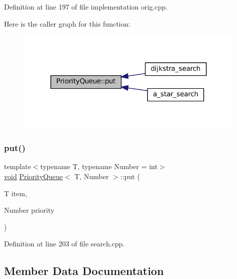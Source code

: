 Definition at line 197 of file implementation orig.\+cpp.

Here is the caller graph for this function\+:\nopagebreak
\begin{figure}[H]
\begin{center}
\leavevmode
\includegraphics[width=312pt]{struct_priority_queue_a9361c94664b98a15a91a595d65c9846c_icgraph}
\end{center}
\end{figure}
\mbox{\label{struct_priority_queue_a9361c94664b98a15a91a595d65c9846c}} 
\subsubsection{\texorpdfstring{put()}{put()}\hspace{0.1cm}{\footnotesize\ttfamily [2/2]}}
{\footnotesize\ttfamily template$<$typename T, typename Number = int$>$ \\
\mbox{\hyperlink{glad_8h_a950fc91edb4504f62f1c577bf4727c29}{void}} \mbox{\hyperlink{struct_priority_queue}{Priority\+Queue}}$<$ T, Number $>$\+::put (\begin{DoxyParamCaption}\item[{T}]{item,  }\item[{Number}]{priority }\end{DoxyParamCaption})\hspace{0.3cm}{\ttfamily [inline]}}



Definition at line 203 of file search.\+cpp.



\subsection{Member Data Documentation}
\mbox{\label{struct_priority_queue_a289cc383607c83fe77a0d571cb06bb01}} 
